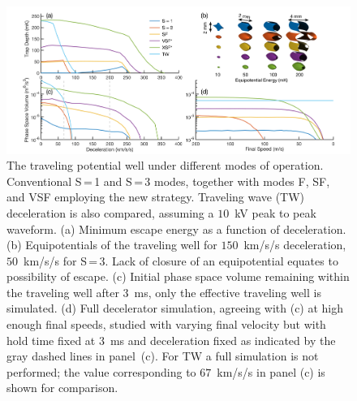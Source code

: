 \documentclass[%
 reprint,
 amsmath,amssymb,
 aps,
prl,
]{revtex4-1}
\begin{document}
\begin{figure}[ht!]
\includegraphics[trim=45 7 40 10, clip, width=\linewidth]{full-four-panel.png}%
\vspace{-5pt}
\caption{
The traveling potential well under different modes of operation. 
Conventional S\,=\,1 and S\,=\,3 modes, together with modes F, SF, and VSF employing the new strategy. 
Traveling wave (TW) deceleration is also compared, assuming a $10$~kV peak to peak waveform. 
(a) Minimum escape energy as a function of deceleration. 
(b) Equipotentials of the traveling well for $150$~km/s/s deceleration, $50$~km/s/s for S\,=\,3. 
Lack of closure of an equipotential equates to possibility of escape. 
(c) Initial phase space volume remaining within the traveling well after $3$~ms, only the effective traveling well is simulated. 
(d) Full decelerator simulation, agreeing with (c) at high enough final speeds, studied with varying final velocity but with hold time fixed at $3$~ms and deceleration fixed as indicated by the gray dashed lines in panel~(c). 
For TW a full simulation is not performed; the value corresponding to $67$~km/s/s in panel (c) is shown for comparison.\vspace{-4mm}}
\label{fig:efftrap}
\end{figure}
\end{document}
